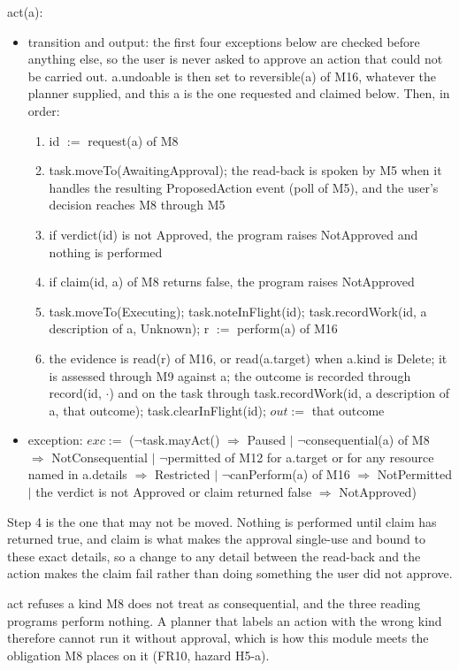 \documentclass[12pt, titlepage]{article}
\begin{document}
\noindent act(a):
\begin{itemize}
\item transition and output: the first four exceptions below are checked before
anything else, so the user is never asked to approve an action that could not be
carried out. a.undoable is then set to reversible(a) of M16, whatever the
planner supplied, and this a is the one requested and claimed below. Then, in
order:
\begin{enumerate}
\item id $:=$ request(a) of M8
\item task.moveTo(AwaitingApproval); the read-back is spoken by M5 when it
handles the resulting ProposedAction event (poll of M5), and the user's decision
reaches M8 through M5
\item if verdict(id) is not Approved, the program raises NotApproved and nothing
is performed
\item if claim(id, a) of M8 returns false, the program raises NotApproved
\item task.moveTo(Executing); task.noteInFlight(id); task.recordWork(id, a
description of a, Unknown); r $:=$ perform(a) of M16
\item the evidence is read(r) of M16, or read(a.target) when a.kind is Delete;
it is assessed through M9 against a; the outcome is recorded through record(id,
$\cdot$) and on the task through task.recordWork(id, a description of a, that
outcome); task.clearInFlight(id); $out :=$ that outcome
\end{enumerate}
\item exception: $exc :=$ ($\lnot$task.mayAct() $\Rightarrow$ Paused $|$
$\lnot$consequential(a) of M8 $\Rightarrow$ NotConsequential $|$
$\lnot$permitted of M12 for a.target or for any resource named in a.details
$\Rightarrow$ Restricted $|$ $\lnot$canPerform(a) of M16 $\Rightarrow$
NotPermitted $|$ the verdict is not Approved or claim returned false
$\Rightarrow$ NotApproved)
\end{itemize}

\noindent Step 4 is the one that may not be moved. Nothing is performed until
claim has returned true, and claim is what makes the approval single-use and
bound to these exact details, so a change to any detail between the read-back
and the action makes the claim fail rather than doing something the user did
not approve.

\noindent act refuses a kind M8 does not treat as consequential, and the three
reading programs perform nothing. A planner that labels an action with the wrong
kind therefore cannot run it without approval, which is how this module meets
the obligation M8 places on it (FR10, hazard H5-a).
\end{document}
